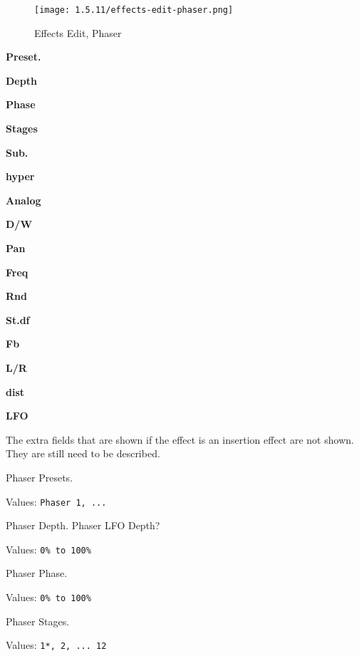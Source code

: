 \begin{figure}[H]
   \centering
   \texttt{[image: 1.5.11/effects-edit-phaser.png]}
   \caption{Effects Edit, Phaser}
   \label{fig:effects_edit_phaser}
\end{figure}


   \begin{enumber}
      \item \textbf{Preset.}
      \item \textbf{Depth}
      \item \textbf{Phase}
      \item \textbf{Stages}
      \item \textbf{Sub.}
      \item \textbf{hyper}
      \item \textbf{Analog}
      \item \textbf{D/W}
      \item \textbf{Pan}
      \item \textbf{Freq}
      \item \textbf{Rnd}
      \item \textbf{St.df}
      \item \textbf{Fb}
      \item \textbf{L/R}
      \item \textbf{dist}
      \item \textbf{LFO}
   \end{enumber}

   The extra fields that are shown if the effect is an insertion effect are
   not shown.  They are still need to be described.

   Phaser Presets.


   Values: \texttt{Phaser 1, ...}


   Phaser Depth. Phaser LFO Depth?

   Values: \texttt{0\% to 100\%}

   Phaser Phase.

   Values: \texttt{0\% to 100\%}

   Phaser Stages.

   Values: \texttt{1*, 2, ... 12}

